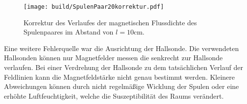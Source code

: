   \begin{figure}[H]
    \centering
    \texttt{[image: build/SpulenPaar20korrektur.pdf]}
    \caption{Korrektur des Verlaufes der magnetischen Flussdichte des Spulenpaares im Abstand von $l = 10 \unit{\centi\meter}$.}
    \label{fig:SpulenPaar20korrektur}
  \end{figure}

  Eine weitere Fehlerquelle war die Ausrichtung der Hallsonde. Die verwendeten Hallsonden können nur Magnetfelder messen die senkrecht zur Hallsonde verlaufen. Bei einer Verdrehung der Hallsonde zu dem tatsächlichen Verlauf der Feldlinien kann die Magnetfeldstärke nicht genau bestimmt werden. Kleinere Abweichungen können durch nicht regelmäßige Wicklung der Spulen oder eine erhöhte Luftfeuchtigkeit, welche die Suszeptibilität des Raums verändert.